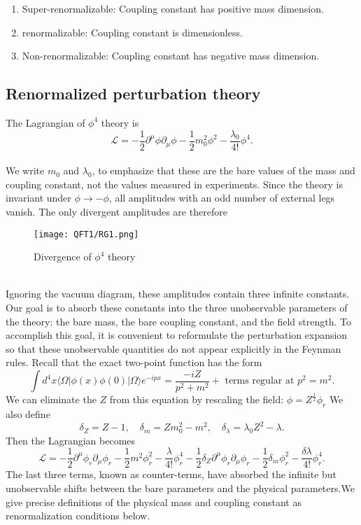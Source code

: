 \begin{enumerate}
\item Super-renormalizable: Coupling constant has positive mass dimension.
\item  renormalizable: Coupling constant is dimensionless.
\item  Non-renormalizable: Coupling constant has negative mass dimension.
\end{enumerate}

\subsection{Renormalized perturbation theory}
The Lagrangian of $\phi^4$ theory is 
\[\mathcal{L} = -\frac{1}{2} \partial^{\mu} \phi \partial_{\mu} \phi -\frac{1}{2}m_0^2 \phi^2 - \frac{\lambda_0}{4!}\phi^4.\]
\\
We write $m_0$ and $\lambda_0$, to emphasize that these are the bare values of the mass and coupling constant, not the values measured in experiments.
Since the theory is invariant under $\phi \to -\phi$, all amplitudes with an odd number of external legs vanish. The only divergent amplitudes are therefore
\begin{figure}[!h]
\centering
\texttt{[image: QFT1/RG1.png]}
\caption{Divergence of $\phi^4$ theory}
\end{figure}
\\
Ignoring the vacuum diagram, these amplitudes contain three infinite constants. Our goal is to absorb these constants into the three unobservable parameters of the theory: the bare mass, the bare coupling constant, and the field strength. To accomplish this goal, it is convenient to reformulate the perturbation expansion so that these unobservable quantities do not appear
explicitly in the Feynman rules. Recall that the exact two-point function has the form
\[\int d^4x \langle \Omega | \phi(x) \phi(0) | \Omega \rangle e^{-ipx} = \frac{-iZ}{p^2+m^2} + \mbox{ terms regular at } p^2 = m^2.\]
We can eliminate the $Z$ from this equation by rescaling the field:
$\phi = Z^{\frac{1}{2}} \phi_r$
We also define
\[\delta_Z = Z -1 , \quad \delta_m = Zm_0^2 - m^2 , \quad \delta_{\lambda} = \lambda_0 Z^2 - \lambda.\]
Then the Lagrangian becomes
\[\mathcal{L} = -\frac{1}{2} \partial^{\mu} \phi_r \partial_{\mu} \phi_r -\frac{1}{2}m^2 \phi_r^2 - \frac{\lambda}{4!}\phi_r^4 -\frac{1}{2} \delta_Z \partial^{\mu} \phi_r \partial_{\mu} \phi_r -\frac{1}{2}\delta_m \phi_r^2 - \frac{\delta \lambda}{4!}\phi_r^4.\]
The last three terms, known as counter-terms, have absorbed the infinite but unobservable shifts between the bare parameters and the physical parameters.We give precise definitions of the physical mass and coupling constant as renormalization conditions below.
